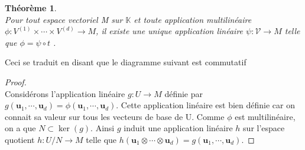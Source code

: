\documentclass[11pt,a4paper,oneside]{book}
\newtheorem{theo}{Théorème}[chapter]
\newtheorem{proof}{Démonstration}
\def\K{\mathbb K}
\def\V{\mathcal V}
\def\u{\mathbf u}
\begin{document}
\begin{theo}
\emph{\\}
Pour tout espace vectoriel M sur $ \K $ et toute application multilinéaire $ \phi:V^{(1)}\times\cdots\times V^{(d)}\longrightarrow M $, il existe une unique application linéaire $ \psi:\V\longrightarrow M $ telle que $ \phi=\psi\circ t$ \cite[p. 125]{Michel2013}.
\end{theo}
Ceci se traduit en disant que le diagramme suivant est commutatif
	\begin{center}
\end{center}

\begin{proof}
\emph{\\}
Considérons l'application linéaire $ g: U\longrightarrow M $ définie par $ g(\u_{1},\cdots,\u_{d})=\phi(\u_{1},\cdots,\u_{d}) $. Cette application linéaire est bien définie car on connait sa valeur sur tous les vecteurs de base de U. Comme $ \phi $ est multilinéaire, on a que $ N\subset \ker(g) $. Ainsi $ g $ induit une application linéaire $ h $ sur l'espace quotient $ h:U/N\longrightarrow M $ telle que $ h(\u_{1}\otimes \cdots\otimes \u_{d})=g(\u_{1},\cdots,\u_{d}).$
\end{proof}
\end{document}
